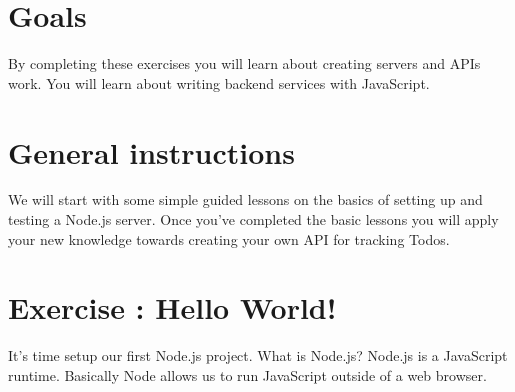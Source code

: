 \documentclass{42-en}
\begin{document}
\chapter{Goals}

        By completing these exercises you will learn about creating servers and 
    APIs work. You will learn about writing backend services with JavaScript.


\chapter{General instructions}

    We will start with some simple guided lessons on the basics of setting up 
and testing a Node.js server. Once you've completed the basic lessons you will 
apply your new knowledge towards creating your own API for tracking Todos.

\startexercices


\chapter{Exercise \exercicenumber: Hello World!}

    It’s time setup our first Node.js project. What is Node.js? Node.js is a JavaScript runtime. Basically Node allows us to run JavaScript outside of a web browser.
\end{document}
